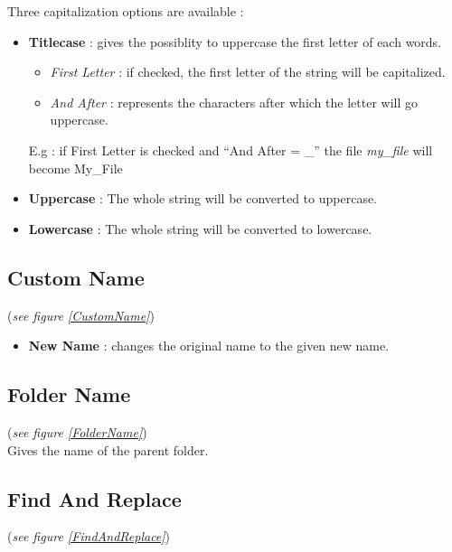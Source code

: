 \documentclass[11pt, a4paper]{scrartcl}
\begin{document}
Three capitalization options are available :
\begin{itemize}
        \item \textbf{Titlecase} : gives the possiblity to uppercase the first letter of each words.
                \begin{itemize}
                        \item \emph{First Letter} : if checked, the first letter of the string will be capitalized. 
                        \item \emph{And After} : represents the characters after which the letter will go uppercase. 
                \end{itemize}
                E.g : if First Letter is checked and ``And After = \_'' the file \emph{my\_file} will become My\_File
        \item \textbf{Uppercase} : The whole string will be converted to uppercase.
        \item \textbf{Lowercase} : The whole string will be converted to lowercase.
\end{itemize}

\subsection*{Custom Name}
(\emph{see figure \ref{CustomName}})\\

\begin{itemize}
        \item \textbf{New Name} : changes the original name to the given new name.
\end{itemize}

\subsection*{Folder Name}
(\emph{see figure \ref{FolderName}})\\

Gives the name of the parent folder.

\subsection*{Find And Replace}
(\emph{see figure \ref{FindAndReplace}})\\
\end{document}
